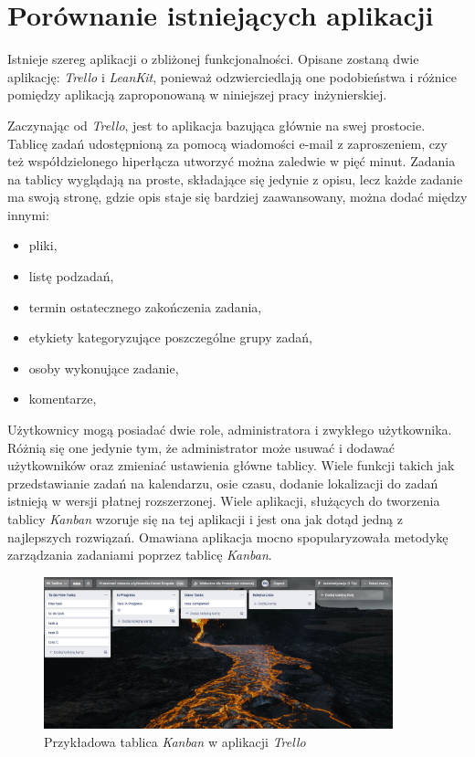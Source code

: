 \section{Porównanie istniejących aplikacji}
Istnieje szereg aplikacji o zbliżonej funkcjonalności. Opisane zostaną dwie aplikację: \textit{Trello} i \textit{LeanKit}, ponieważ odzwierciedlają one podobieństwa i różnice pomiędzy aplikacją zaproponowaną w niniejszej pracy inżynierskiej.


Zaczynając od \textit{Trello}, jest to aplikacja bazująca głównie na swej prostocie. Tablicę zadań udostępnioną za pomocą wiadomości e-mail z zaproszeniem, czy też współdzielonego hiperłącza utworzyć można zaledwie w pięć minut. Zadania na tablicy wyglądają na proste, składające się jedynie z opisu, lecz każde zadanie ma swoją stronę, gdzie opis staje się bardziej zaawansowany, można dodać między innymi:
\begin{itemize}
	\item pliki, 
	\item listę podzadań,
	\item termin ostatecznego zakończenia zadania,
	\item etykiety kategoryzujące poszczególne grupy zadań,
	\item osoby wykonujące zadanie,
	\item komentarze,
\end{itemize}
Użytkownicy mogą posiadać dwie role, administratora i zwykłego użytkownika. Różnią się one jedynie tym, że administrator może usuwać i dodawać użytkowników oraz zmieniać ustawienia główne tablicy. Wiele funkcji takich jak przedstawianie zadań na kalendarzu, osie czasu, dodanie lokalizacji do zadań istnieją w wersji płatnej rozszerzonej. Wiele aplikacji, służących do tworzenia tablicy \textit{Kanban} wzoruje się na tej aplikacji i jest ona jak dotąd jedną z najlepszych rozwiązań. Omawiana aplikacja mocno spopularyzowała metodykę zarządzania zadaniami poprzez tablicę \textit{Kanban}.

\begin{figure}[h]
	\centering
	\includegraphics[width=0.90\textwidth]{tablica-operacyjna}		
	\caption{Przykładowa tablica \textit{Kanban} w aplikacji \textit{Trello}}
\end{figure}

